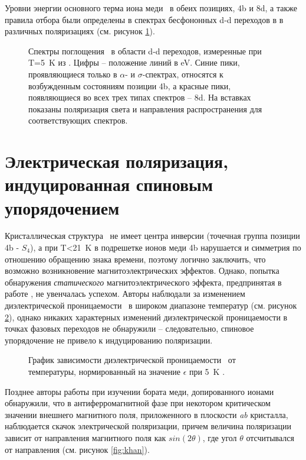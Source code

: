 Уровни энергии основного терма иона меди \cud\ в обеих позициях, 4b и 8d, а также правила отбора были определены в спектрах бесфононных d-d переходов в \cbo в различных поляризациях (см. рисунок \cref{fig:dd_transitions}).

\begin{figure}[ht]
	\caption{Спектры поглощения \cbo\ в области d-d переходов, измеренные при T=\SI{5}{\kelvin} из \cite{Pisarev2011}. Цифры -- положение линий в \si{\electronvolt}. Синие пики, проявляющиеся только в $\alpha$- и $\sigma$-спектрах, относятся к возбужденным состояниям позиции 4b, а красные пики, появляющиеся во всех трех типах спектров -- 8d. На вставках показаны поляризация света и направления распространения для соответствующих спектров.}
	\label{fig:dd_transitions}
\end{figure}

\section{Электрическая поляризация, индуцированная спиновым упорядочением}\label{sec:ch1/sec2}

Кристаллическая структура \cbo\ не имеет центра инверсии (точечная группа позиции 4b - \(S_4\)), а при T<\SI{21}{\kelvin} в подрешетке ионов меди 4b нарушается и симметрия по отношению обращению знака времени, поэтому логично заключить, что возможно возникновение магнитоэлектрических эффектов. Однако, попытка обнаружения \emph{статического} магнитоэлектрического эффекта, предпринятая в работе \cite{Nenert2007}, не увенчалась успехом. Авторы наблюдали за изменением диэлектрической проницаемости \cbo\ в широком диапазоне температур (см. рисунок \cref{fig:nenert}), однако никаких характерных изменений диэлектрической проницаемости в точках фазовых переходов не обнаружили -- следовательно, спиновое упорядочение не привело к индуцированию поляризации.

\begin{figure}[ht]
	\caption{График зависимости диэлектрической проницаемости \cbo\ от температуры, нормированный на значение $\epsilon$ при \SI{5}{\kelvin} \cite{Nenert2007}.}
	\label{fig:nenert}
\end{figure}

Позднее авторы работы \cite{Khanh2013} при изучении бората меди, допированного ионами \niIon\, обнаружили, что в антиферромагнитной фазе при некотором критическом значении внешнего магнитного поля, приложенного в плоскости \textit{ab} кристалла, наблюдается скачок электрической поляризации, причем величина поляризации зависит от направления магнитного поля как \(sin\left(2\theta\right)\), где угол \(\theta\) отсчитывался от направления  (см. рисунок \cref{fig:khan}).

